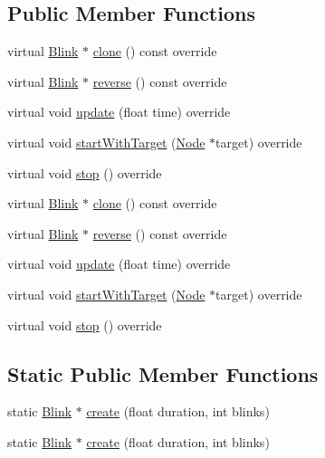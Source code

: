 \subsection*{Public Member Functions}
\begin{DoxyCompactItemize}
\item 
virtual \hyperlink{classBlink}{Blink} $\ast$ \hyperlink{classBlink_a01f5110523a8984f73a447cac74f1121}{clone} () const override
\item 
virtual \hyperlink{classBlink}{Blink} $\ast$ \hyperlink{classBlink_a4e2631e42f7ef86f0fc5097e87f352c5}{reverse} () const override
\item 
virtual void \hyperlink{classBlink_a20ce5c25af940fe152d600a20b183f84}{update} (float time) override
\item 
virtual void \hyperlink{classBlink_a29dde0a5d1edba675cd5a9e60cfa2de7}{start\+With\+Target} (\hyperlink{classNode}{Node} $\ast$target) override
\item 
virtual void \hyperlink{classBlink_ac2299db1e757e2911e35ee9c88fc477c}{stop} () override
\item 
virtual \hyperlink{classBlink}{Blink} $\ast$ \hyperlink{classBlink_afb2d2eb745a9a3ea9f157fd9e83ca19a}{clone} () const override
\item 
virtual \hyperlink{classBlink}{Blink} $\ast$ \hyperlink{classBlink_aa491375c4dd70b209c4602a58b6e6e95}{reverse} () const override
\item 
virtual void \hyperlink{classBlink_aa9e0a219061963eecfa5b8193f2780f2}{update} (float time) override
\item 
virtual void \hyperlink{classBlink_aba011d756d22e0094d87a70d9ae6c613}{start\+With\+Target} (\hyperlink{classNode}{Node} $\ast$target) override
\item 
virtual void \hyperlink{classBlink_a081f03902fb69d5b4ec0fddf0ee72b60}{stop} () override
\end{DoxyCompactItemize}
\subsection*{Static Public Member Functions}
\begin{DoxyCompactItemize}
\item 
static \hyperlink{classBlink}{Blink} $\ast$ \hyperlink{classBlink_a283462c9ff5a6c4fcd33ad9f125a8f8b}{create} (float duration, int blinks)
\item 
static \hyperlink{classBlink}{Blink} $\ast$ \hyperlink{classBlink_a4369df860989ce2c3ffe8b535cfdae1c}{create} (float duration, int blinks)
\end{DoxyCompactItemize}
